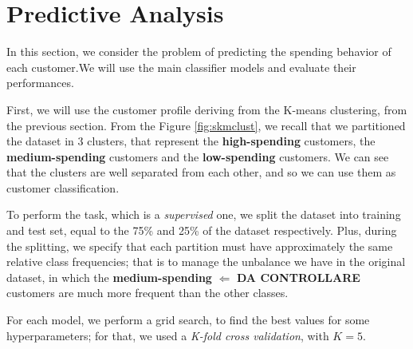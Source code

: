 \section{Predictive Analysis}
In this section, we consider the problem of predicting the spending behavior of each customer.We will use the main classifier models and evaluate their performances.

First, we will use the customer profile deriving from the K-means clustering, from the previous section.
From the Figure \ref{fig:skmclust}, we recall that we partitioned the dataset in 3 clusters, that represent the \textbf{high-spending} customers, the \textbf{medium-spending} customers and the \textbf{low-spending} customers.
We can see that the clusters are well separated from each other, and so we can use them as customer classification. 

To perform the task, which is a \emph{supervised} one, we split the dataset into training and test set, equal to the 75\% and 25\% of the dataset respectively. Plus, during the splitting, we specify that each partition must have approximately the same relative class frequencies;
that is to manage the unbalance we have in the original dataset, in which the \textbf{medium-spending} $\Leftarrow$ \textbf{DA CONTROLLARE} customers are much more frequent than the other classes.

For each model, we perform a grid search, to find the best values for some hyperparameters; for that, we used a \emph{K-fold cross validation}, with $K=5$.

